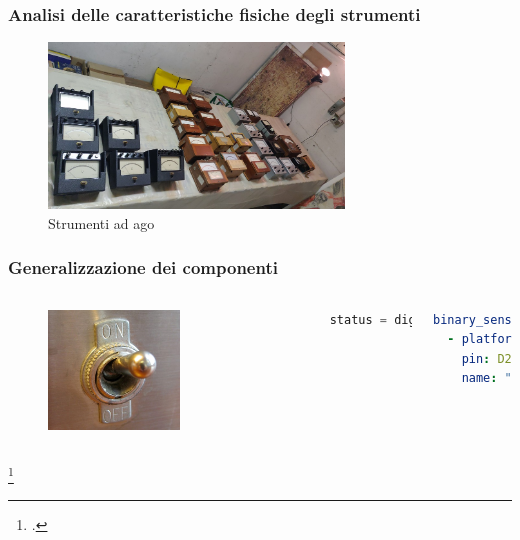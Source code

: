 \documentclass[aspectratio=169]{beamer}
\begin{document}
\begin{frame}
\frametitle{Analisi delle caratteristiche fisiche degli strumenti}

\begin{figure}[h]
  \centering
  \includegraphics[width=0.7\textwidth]{strumentiago}
  \caption{Strumenti ad ago}
\end{figure}
\end{frame}

\begin{frame}[fragile]
\frametitle{Generalizzazione dei componenti}
\begin{columns}
\begin{figure}[h]
  \centering
  \includegraphics[width=0.6\textwidth]{switch}\footnotemark 
  
\end{figure}

\begin{lstlisting}[language=cpp]
status = digitalRead(D2);
\end{lstlisting}

\begin{lstlisting}[language=yaml]
binary_sensor:
  - platform: gpio
    pin: D2
    name: "Interruttore"
\end{lstlisting}
\end{columns}
\footcitetext{wiki:switch}
\end{frame}
\end{document}
